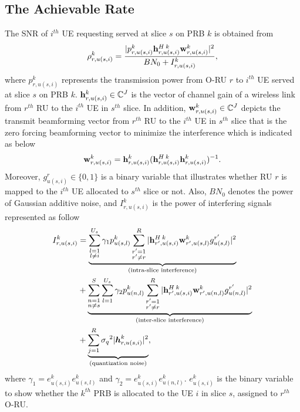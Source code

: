 \documentclass{article}
\begin{document}
\subsection{The Achievable Rate}
The SNR of $i^{th}$ UE requesting served at slice $s$ on PRB $k$ is obtained from
\begin{equation}\label{eq2}
\rho_{r,u(s,i)}^{k} =  \frac{|p_{r,u(s,i)}^{k}{\bold{h}_{r,u(s,i)}^{H \: k}} \bold{w}_{r,u(s,i)}^{k}|^2}{BN_0 + I_{r,u(s,i)}^{k}},
\end{equation} 
where $p_{r,u(s,i)}^{k}$ represents the transmission power from O-RU $r$ to $i^{th}$ UE served at slice $s$ on PRB $k$. 
${\bold{h}_{r,u(s,i)}^{k}} \in \mathbb{C}^{J}$ is the vector of channel gain of a wireless link from 
$r^{th}$ RU to the $i^{th}$ UE in $s^{th}$ slice. In addition, $\bold{w}_{r,u(s,i)}^{k} \in \mathbb{C}^{J}$ depicts the  transmit beamforming vector from $r^{th}$ RU to the $i^{th}$ UE in $s^{th}$ slice that is the zero forcing beamforming vector to minimize the interference which is indicated as below
\begin{equation}
\bold{w}_{r,u(s,i)}^{k} = {\bold{h}_{r,u(s,i)}^{k}}({\bold{h}_{r,u(s,i)}^{H \: k}} {\bold{h}_{r,u(s,i)}^{k}})^{-1}.
\end{equation}
Moreover, $g_{u(s,i)}^r \in \{0,1\}$ is a binary variable that illustrates whether RU $r$ is mapped to the $i^{th}$ UE allocated to $s^{th}$ slice or not. 
Also, $BN_0$ denotes the power of Gaussian additive noise, and $I_{r,u(s,i)}^{k}$ is the power of interfering signals represented as follow
\begin{equation}\label{eqI}
\begin{split}
I_{r,u(s,i)}^{k} &=
 \underbrace{\sum_{\substack{l=1 \\ l\neq i}}^{{U}_{s}} \gamma_{1}  p_{u(s,l)}^{k}\sum_{\substack{r'=1 \\ r'\neq r}}^{R}|{\bold{h}_{r',u(s,i)}^{H \: k}} \bold{w}_{r',u(s,l)}^{k} g_{u(s,l)}^{r'}|^2}_{\text{(intra-slice interference)}}\\
&+ \underbrace{\sum_{\substack{n = 1 \\ n\neq s}}^{S}\sum_{l=1}^{{U}_s} \gamma_{2}  p_{u(n,l)}^{k}\sum_{\substack{r'=1 \\ r'\neq r}}^{R}|{\bold{h}_{r',u(s,i)}^{H \: k}} \bold{w}_{r',u(n,l)}^{k} g_{u(n,l)}^{r'}|^2}_{\text{(inter-slice interference)}}\\
&+\underbrace{  \sum_{j=1}^{{R}} {\sigma_q}^2 |\boldsymbol{h}_{r,{u(s,i)}}^k|^2 }_{\text{(quantization noise)}},
\end{split}
\end{equation}
where $\gamma_{1} = e^{k}_{u(s,i)}e^{k}_{u(s,l)}$ and $\gamma_{2} = e^{k}_{u(s,i)}e^{k}_{u(n,l)}$.
$e^{k}_{u(s,i)}$ is the binary variable to show whether the $k^{th}$ PRB is allocated to the UE $i$ in slice $s$, assigned to $r^{th}$ O-RU.
\end{document}
